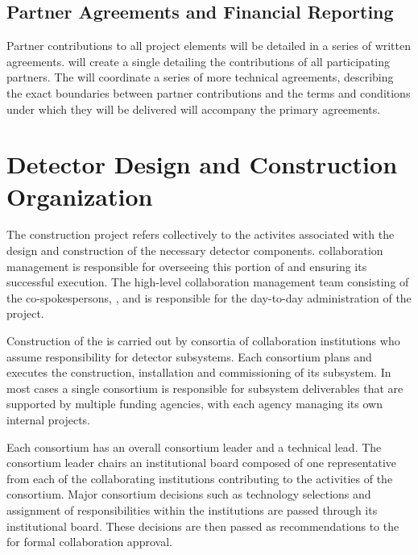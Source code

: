 \subsection{Partner Agreements and Financial Reporting}
\label{sec:dune_agreements}

Partner contributions to all project elements will be detailed 
in a series of written agreements.   will create a single  
detailing the contributions of all participating partners.  
 The   will coordinate a series of more technical agreements, describing the exact 
boundaries between partner contributions and the terms and 
conditions under which they will be delivered will accompany
 the primary agreements.   

\section{Detector Design and Construction Organization}
\label{sec:es-tc-det-const}

The   construction project refers collectively 
to the activites associated with the design and construction of the
necessary detector components.   collaboration management 
is responsible for overseeing this portion of  and 
ensuring its successful execution.  The high-level  
collaboration management team consisting of the co-spokespersons, 
, and  is responsible for the day-to-day 
administration of the project.  

Construction of the   is carried out by 
consortia of collaboration institutions who assume responsibility 
for detector subsystems. Each consortium plans and executes the 
construction, installation and commissioning of its subsystem.  In most cases a single consortium is responsible for subsystem deliverables that are supported by 
multiple funding agencies, with each agency managing its own internal projects. 

Each consortium has an overall consortium leader 
and a technical lead.  The consortium leader chairs an institutional 
board composed of one representative from each of the collaborating 
institutions contributing to the activities of the consortium.  Major 
consortium decisions such as technology selections and assignment of 
responsibilities within the institutions are passed through its institutional 
board.  These decisions are then passed as recommendations to 
the   for formal collaboration approval.

